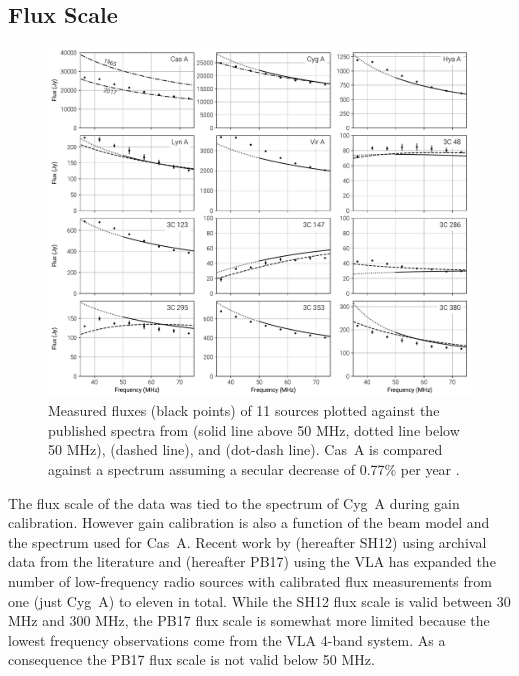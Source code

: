 \documentclass[twocolumn]{aastex61}
\begin{document}
\subsection{Flux Scale}

\begin{figure}[t]
    \includegraphics[width=\textwidth]{figures/flux-scale/flux-scale}
    \caption{
        Measured fluxes (black points) of 11 sources plotted against the published spectra from
        \citet{2017ApJS..230....7P} (solid line above 50 MHz, dotted line below 50 MHz),
        \citet{2012MNRAS.423L..30S} (dashed line), and \citet{1977A&A....61...99B} (dot-dash line).
        Cas~A is compared against a spectrum assuming a secular decrease of 0.77\% per year
        \citep{2009AJ....138..838H}.
    }
    \label{fig:flux-scale}
\end{figure}

The flux scale of the data was tied to the \citet{1977A&A....61...99B} spectrum of Cyg~A during gain
calibration. However gain calibration is also a function of the beam model and the spectrum used for
Cas~A. Recent work by \citet{2012MNRAS.423L..30S} (hereafter SH12) using archival data from the
literature and \citet{2017ApJS..230....7P} (hereafter PB17) using the VLA has expanded the number of
low-frequency radio sources with calibrated flux measurements from one (just Cyg~A) to eleven in
total. While the SH12 flux scale is valid between 30 MHz and 300 MHz, the PB17 flux scale is
somewhat more limited because the lowest frequency observations come from the VLA 4-band system. As
a consequence the PB17 flux scale is not valid below 50 MHz.
\end{document}
